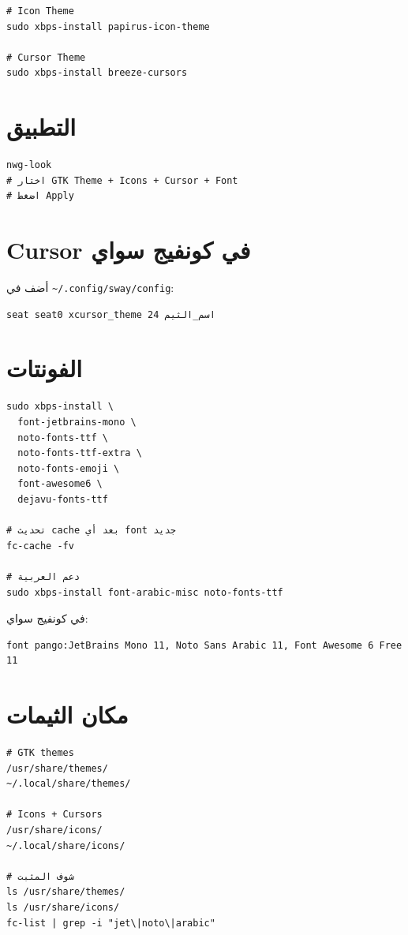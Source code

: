 \documentclass[12pt, a4paper]{report}
\newcommand{\file}[1]{\texttt{\color{warn}#1}}
\begin{document}
\begin{lstlisting}
# Icon Theme
sudo xbps-install papirus-icon-theme

# Cursor Theme
sudo xbps-install breeze-cursors
\end{lstlisting}

\section{التطبيق}
\begin{lstlisting}
nwg-look
# اختار GTK Theme + Icons + Cursor + Font
# اضغط Apply
\end{lstlisting}

\section{Cursor في كونفيج سواي}

أضف في \file{\textasciitilde/.config/sway/config}:
\begin{lstlisting}
seat seat0 xcursor_theme اسم_الثيم 24
\end{lstlisting}

\section{الفونتات}
\begin{lstlisting}
sudo xbps-install \
  font-jetbrains-mono \
  noto-fonts-ttf \
  noto-fonts-ttf-extra \
  noto-fonts-emoji \
  font-awesome6 \
  dejavu-fonts-ttf

# تحديث cache بعد أي font جديد
fc-cache -fv

# دعم العربية
sudo xbps-install font-arabic-misc noto-fonts-ttf
\end{lstlisting}

في كونفيج سواي:
\begin{lstlisting}
font pango:JetBrains Mono 11, Noto Sans Arabic 11, Font Awesome 6 Free 11
\end{lstlisting}

\section{مكان الثيمات}
\begin{lstlisting}
# GTK themes
/usr/share/themes/
~/.local/share/themes/

# Icons + Cursors
/usr/share/icons/
~/.local/share/icons/

# شوف المثبت
ls /usr/share/themes/
ls /usr/share/icons/
fc-list | grep -i "jet\|noto\|arabic"
\end{lstlisting}
\end{document}
